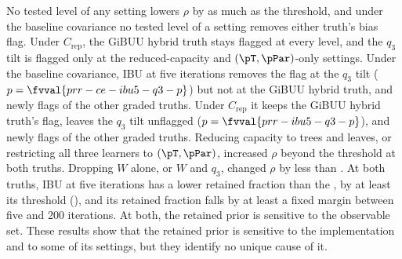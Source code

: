 No tested level of any setting lowers $\rho$ by as much as the threshold, and under the baseline covariance no tested level of a setting removes either truth's bias flag. Under $C_{\mathrm{rep}}$, the GiBUU hybrid truth stays flagged at every level, and the $q_3$ tilt is flagged only at the reduced-capacity and $(\pT,\pPar)$-only settings. Under the baseline covariance, IBU at five iterations removes the flag at the $q_3$ tilt ($p=\fvval{prr-ce-ibu5-q3-p}$) but not at the GiBUU hybrid truth, and newly flags  of the other graded truths. Under $C_{\mathrm{rep}}$ it keeps the GiBUU hybrid truth's flag, leaves the $q_3$ tilt unflagged ($p=\fvval{prr-ibu5-q3-p}$), and newly flags  of the other graded truths. Reducing capacity to  trees and  leaves, or restricting all three learners to $(\pT,\pPar)$, increased $\rho$ beyond the threshold at both truths. Dropping $W$ alone, or $W$ and $q_3$, changed $\rho$ by less than . At both truths, IBU at five iterations has a lower retained fraction than the \estMultiD{}, by at least its threshold (), and its retained fraction falls by at least a fixed margin between five and 200 iterations. At both, the retained prior is sensitive to the observable set. These results show that the retained prior is sensitive to the implementation and to some of its settings, but they identify no unique cause of it.

